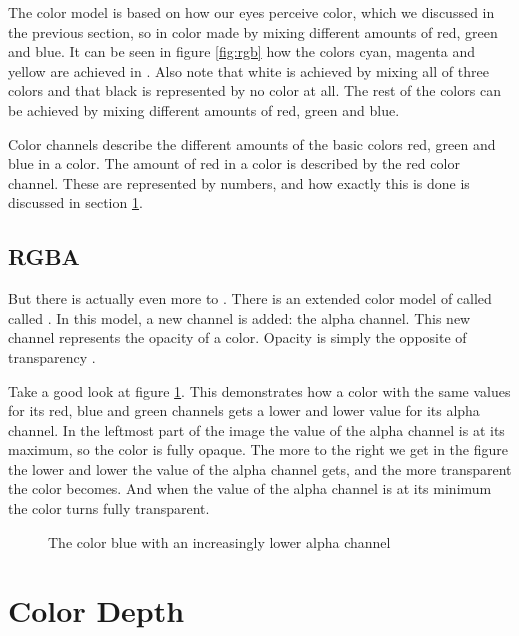 The \rgb color model is based on how our eyes perceive color, which we
discussed in the previous section, so in \rgb color made by mixing
different amounts of red, green and blue. It can be seen in figure
\ref{fig:rgb} how the colors cyan, magenta and yellow are achieved in
\rgb. Also note that white is achieved by mixing all of three colors
and that black is represented by no color at all. The rest of the
colors can be achieved by mixing different amounts of red, green and
blue.

Color channels describe the different amounts of the basic colors red,
green and blue in a color. The amount of red in a color is described
by the red color channel. These are represented by numbers, and how
exactly this is done is discussed in section \ref{sec:color-depth}.

\subsection{RGBA}

But there is actually even more to \rgb. There is an extended color
model of \rgb called called \rgba. In this model, a new channel is
added: the alpha channel. This new channel represents the opacity of a
color. Opacity is simply the opposite of transparency
\cite{porter84_compos_dig_img,murray1996encyclopedia,niederst1999webdesign}.

Take a good look at figure \ref{fig:alpha}. This demonstrates how a
color with the same values for its red, blue and green channels gets a
lower and lower value for its alpha channel. In the leftmost part of
the image the value of the alpha channel is at its maximum, so the
color is fully opaque. The more to the right we get in the figure the
lower and lower the value of the alpha channel gets, and the more
transparent the color becomes. And when the value of the alpha channel
is at its minimum the color turns fully transparent.

\begin{figure}
  \centering
  \caption{The color blue with an increasingly lower alpha channel}
  \label{fig:alpha}
\end{figure}

\newcommand{\rgbtrip}[3]{\mbox{(#1,#2,#3)}}

\section{Color Depth}
\label{sec:color-depth}

